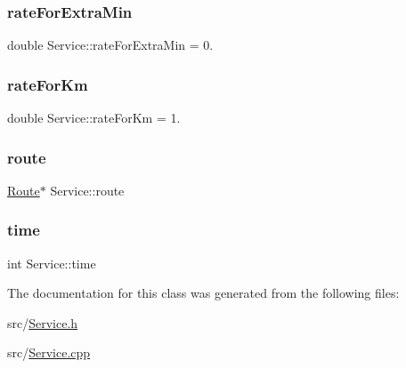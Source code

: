 \hypertarget{classService_a6b98e1285e0eebbcddeab247336d0eb5}{}\label{classService_a6b98e1285e0eebbcddeab247336d0eb5} 
\subsubsection{\texorpdfstring{rate\+For\+Extra\+Min}{rateForExtraMin}}
{\footnotesize\ttfamily double Service\+::rate\+For\+Extra\+Min = 0.\hspace{0.3cm}{\ttfamily [static]}}

\hypertarget{classService_aee8dfc7647ae55570b8240b9dff699f4}{}\label{classService_aee8dfc7647ae55570b8240b9dff699f4} 
\subsubsection{\texorpdfstring{rate\+For\+Km}{rateForKm}}
{\footnotesize\ttfamily double Service\+::rate\+For\+Km = 1.\hspace{0.3cm}{\ttfamily [static]}}

\hypertarget{classService_a3059a95085ce11e13a69ff19bc919f9a}{}\label{classService_a3059a95085ce11e13a69ff19bc919f9a} 
\subsubsection{\texorpdfstring{route}{route}}
{\footnotesize\ttfamily \hyperlink{classRoute}{Route}$\ast$ Service\+::route\hspace{0.3cm}{\ttfamily [private]}}

\hypertarget{classService_ad48b41e25edbf42e8f0a0314adc8de4e}{}\label{classService_ad48b41e25edbf42e8f0a0314adc8de4e} 
\subsubsection{\texorpdfstring{time}{time}}
{\footnotesize\ttfamily int Service\+::time\hspace{0.3cm}{\ttfamily [private]}}



The documentation for this class was generated from the following files\+:\begin{DoxyCompactItemize}
\item 
src/\hyperlink{Service_8h}{Service.\+h}\item 
src/\hyperlink{Service_8cpp}{Service.\+cpp}\end{DoxyCompactItemize}
